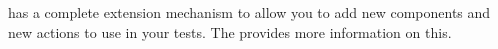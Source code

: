 \app{} has a complete extension mechanism to allow you to add new components and new actions to use in your tests. The  provides more information on this. 

